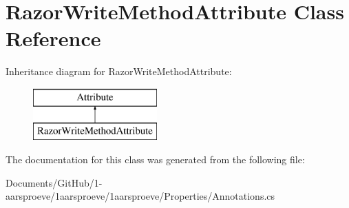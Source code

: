 \hypertarget{class_razor_write_method_attribute}{}\section{Razor\+Write\+Method\+Attribute Class Reference}
\label{class_razor_write_method_attribute}
Inheritance diagram for Razor\+Write\+Method\+Attribute\+:\begin{figure}[H]
\begin{center}
\leavevmode
\includegraphics[height=2.000000cm]{class_razor_write_method_attribute}
\end{center}
\end{figure}


The documentation for this class was generated from the following file\+:\begin{DoxyCompactItemize}
\item 
Documents/\+Git\+Hub/1-\/aarsproeve/1aarsproeve/1aarsproeve/\+Properties/Annotations.\+cs\end{DoxyCompactItemize}
